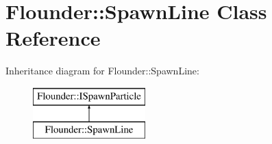 \hypertarget{class_flounder_1_1_spawn_line}{}\section{Flounder\+:\+:Spawn\+Line Class Reference}
\label{class_flounder_1_1_spawn_line}
Inheritance diagram for Flounder\+:\+:Spawn\+Line\+:\begin{figure}[H]
\begin{center}
\leavevmode
\includegraphics[height=2.000000cm]{class_flounder_1_1_spawn_line}
\end{center}
\end{figure}
